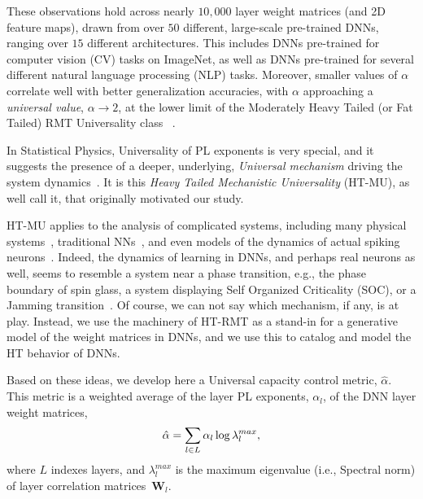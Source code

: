 These observations hold across nearly $10,000$ layer weight matrices (and 2D feature maps), drawn from over $50$ different, large-scale pre-trained DNNs, ranging over $15$ different architectures.
This includes DNNs pre-trained for computer vision (CV) tasks on ImageNet, as well as DNNs pre-trained for several different natural language processing (NLP) tasks.
Moreover, smaller values of $\alpha$ correlate well with better generalization accuracies, with $\alpha$ approaching a \emph{universal value}, $\alpha\rightarrow 2$, at the lower limit of the Moderately Heavy Tailed (or Fat Tailed) RMT Universality class~\cite{MM18_TR,MM19_HTSR_ICML} .  

In Statistical Physics, Universality of PL exponents is very special, and it suggests the presence of a deeper, underlying, \emph{Universal mechanism} driving the system dynamics~\cite{SornetteBook,BouchaudPotters03}.
It is this \emph{Heavy Tailed Mechanistic Universality} (HT-MU), as well call it, that originally motivated our study.  

HT-MU applies to the analysis of complicated systems, including many physical systems~\cite{SornetteBook}, traditional NNs~\cite{EB01_BOOK,nishimori01}, and even models of the dynamics of actual spiking neurons~\cite{FIBX12}.
Indeed, the dynamics of learning in DNNs, and perhaps real neurons as well, seems to resemble a system near a phase transition, e.g., the phase boundary of spin glass, a system displaying Self Organized Criticality (SOC), or a Jamming transition~\cite{GSdx18_TR,SGd18_TR}. 
Of course, we can not say which mechanism, if any, is at play. 
Instead, we use the machinery of  HT-RMT as a stand-in for a generative model of the weight matrices in DNNs, and we use this to catalog and model the HT behavior of DNNs.%

Based on these ideas, we develop here a Universal capacity control metric, $\hat{\alpha}$.
This metric is a weighted average of the layer PL exponents, $\alpha_{l}$, of the DNN layer weight matrices,
\vspace{-2mm}
\begin{equation}
\hat{\alpha}=\sum_{l\in L}\alpha_{l}\log\lambda_{l}^{max}  ,
\label{eqn:alpha_hat_specific}
\vspace{-1mm}
\end{equation}
where $L$ indexes layers, and 
$\lambda_{l}^{max}$ is the maximum eigenvalue (i.e., Spectral norm) of layer correlation matrices~$\mathbf{W}_{l}$. 

\vspace{-2mm}
